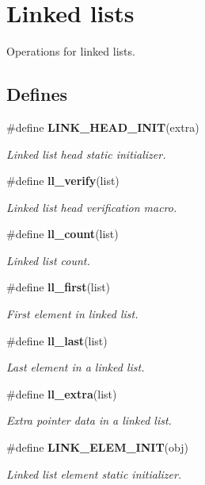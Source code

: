 \section{Linked lists}
\label{group__dbprim__link}
Operations for linked lists. 
\subsection*{Defines}
\begin{CompactItemize}
\item 
\#define {\bf LINK\_\-HEAD\_\-INIT}(extra)
\begin{CompactList}\small\item\em Linked list head static initializer.\item\end{CompactList}\item 
\#define {\bf ll\_\-verify}(list)
\begin{CompactList}\small\item\em Linked list head verification macro.\item\end{CompactList}\item 
\#define {\bf ll\_\-count}(list)
\begin{CompactList}\small\item\em Linked list count.\item\end{CompactList}\item 
\#define {\bf ll\_\-first}(list)
\begin{CompactList}\small\item\em First element in linked list.\item\end{CompactList}\item 
\#define {\bf ll\_\-last}(list)
\begin{CompactList}\small\item\em Last element in a linked list.\item\end{CompactList}\item 
\#define {\bf ll\_\-extra}(list)
\begin{CompactList}\small\item\em Extra pointer data in a linked list.\item\end{CompactList}\item 
\#define {\bf LINK\_\-ELEM\_\-INIT}(obj)
\begin{CompactList}\small\item\em Linked list element static initializer.\item\end{CompactList}\item 

\end{CompactItemize}
